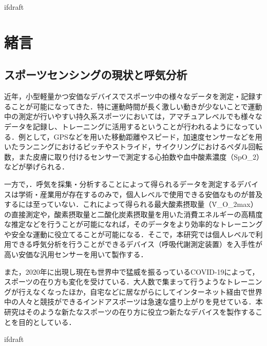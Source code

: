 \expandafter\ifx\csname ifdraft\endcsname\relax
 
\fi

\section{緒言}

\subsection{スポーツセンシングの現状と呼気分析}

近年，小型軽量かつ安価なデバイスでスポーツ中の様々なデータを測定・記録することが可能になってきた．特に運動時間が長く激しい動きが少ないことで運動中の測定が行いやすい持久系スポーツにおいては，アマチュアレベルでも様々なデータを記録し、トレーニングに活用するということが行われるようになっている．例として，GPSなどを用いた移動距離やスピード，加速度センサーなどを用いたランニングにおけるピッチやストライド，サイクリングにおけるペダル回転数，また皮膚に取り付けるセンサーで測定する心拍数や血中酸素濃度（SpO_2）などが挙げられる．

一方で，．呼気を採集・分析することによって得られるデータを測定するデバイスは学術・産業用が存在するのみで，個人レベルで使用できる安価なものが普及するには至っていない．これによって得られる最大酸素摂取量（\.{V}_{O_2max}）の直接測定や，酸素摂取量と二酸化炭素摂取量を用いた消費エネルギーの高精度な推定などを行うことが可能になれば，そのデータをより効率的なトレーニングや安全な運動に役立てることが可能になる．そこで，本研究では個人レベルで利用できる呼気分析を行うことができるデバイス（呼吸代謝測定装置）を入手性が高い安価な汎用センサーを用いて製作する．

また，2020年に出現し現在も世界中で猛威を振るっているCOVID-19によって，スポーツの在り方も変化を受けている．大人数で集まって行うようなトレーニングが行えなくなったほか，自宅などに居ながらにしてインターネット経由で世界中の人々と競技ができるインドアスポーツは急速な盛り上がりを見せている．本研究はそのような新たなスポーツの在り方に役立つ新たなデバイスを製作することを目的としている．

\expandafter\ifx\csname ifdraft\endcsname\relax
  
\fi
